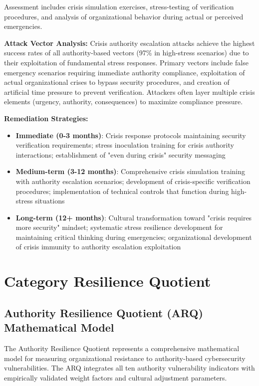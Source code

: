 \documentclass[11pt,a4paper]{article}
\begin{document}
Assessment includes crisis simulation exercises, stress-testing of verification procedures, and analysis of organizational behavior during actual or perceived emergencies.

\textbf{Attack Vector Analysis:}
Crisis authority escalation attacks achieve the highest success rates of all authority-based vectors (97\% in high-stress scenarios) due to their exploitation of fundamental stress responses. Primary vectors include false emergency scenarios requiring immediate authority compliance, exploitation of actual organizational crises to bypass security procedures, and creation of artificial time pressure to prevent verification. Attackers often layer multiple crisis elements (urgency, authority, consequences) to maximize compliance pressure.

\textbf{Remediation Strategies:}
\begin{itemize}
\item \textbf{Immediate (0-3 months)}: Crisis response protocols maintaining security verification requirements; stress inoculation training for crisis authority interactions; establishment of "even during crisis" security messaging
\item \textbf{Medium-term (3-12 months)}: Comprehensive crisis simulation training with authority escalation scenarios; development of crisis-specific verification procedures; implementation of technical controls that function during high-stress situations
\item \textbf{Long-term (12+ months)}: Cultural transformation toward "crisis requires more security" mindset; systematic stress resilience development for maintaining critical thinking during emergencies; organizational development of crisis immunity to authority escalation exploitation
\end{itemize}

\section{Category Resilience Quotient}

\subsection{Authority Resilience Quotient (ARQ) Mathematical Model}

The Authority Resilience Quotient represents a comprehensive mathematical model for measuring organizational resistance to authority-based cybersecurity vulnerabilities. The ARQ integrates all ten authority vulnerability indicators with empirically validated weight factors and cultural adjustment parameters.
\end{document}

